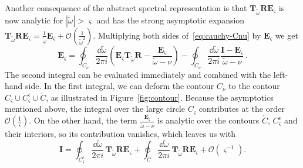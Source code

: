 \documentclass[aps, prd, amsmath, floats, floatfix, twocolumn, nofootinbib, superscriptaddress, showpacs]{revtex4-1}
\def\E{\mathbf{E}}
\def\R{\mathbf{R}}
\def\T{\mathbf{T}}
\def\tomega{{\tilde{\omega}}}
\begin{document}
Another consequence of the abstract spectral representation is that
$\T_\tomega \R \E_\varsigma$ is now analytic for $|\tomega| > \varsigma$
and has the strong asymptotic expansion $\T_\tomega \R \E_\varsigma =
\frac{1}{\tomega} \E_\varsigma + \mathcal{O}(\frac{1}{\tomega^{2}})$. Multiplying
both sides of~\eqref{eq:cauchy-Cnu} by $\E_\varsigma$ we get
\begin{equation*}
\E_\varsigma = \oint_{C_\nu} \frac{\dd\tomega}{2\pi i}
\left( \E_\varsigma \T_\tomega \R - \frac{\E_\varsigma}{\tomega-\nu} \right)
- \oint_{C_\nu} \frac{\dd\tomega}{2\pi i} \frac{\mathbf{I}-\E_\varsigma}{\tomega-\nu} \, .
\end{equation*}
The second integral can be evaluated immediately and combined with the
left-hand side. In the first integral, we can deform the contour $C_\nu$
to the contour $C_\varsigma \cup C^\epsilon_\varsigma \cup
\mathring{C}$, as illustrated in Figure~\ref{fig:contour}. Because
the asymptotics mentioned above, the integral over the large circle
$C_\varsigma$ contributes at the order $\mathcal{O}(\frac{1}{\varsigma})$. On the
other hand, the term $\frac{\E_\varsigma}{\tomega-\nu}$ is analytic over
the contours $\mathring{C}$, $C^\epsilon_\varsigma$ and their interiors,
so its contribution vanishes, which leaves us with
\begin{equation} \label{eq:cauchy-Ceps}
\mathbf{I}
= \oint_{C^\epsilon_\varsigma} \frac{\dd\tomega}{2\pi i} \,
\T_\tomega \R \E_\varsigma
+ \oint_{\mathring{C}} \frac{\dd\tomega}{2\pi i} \,
\T_\tomega \R \E_\varsigma
+ \mathcal{O}(\varsigma^{-1}) .
\end{equation}
\end{document}

